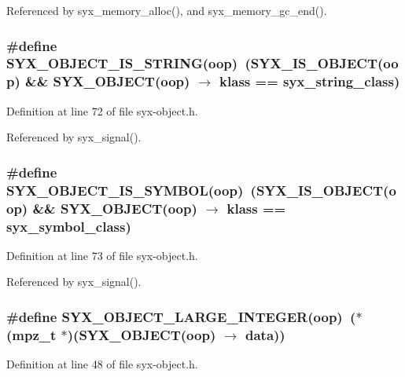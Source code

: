 Referenced by syx\_\-memory\_\-alloc(), and syx\_\-memory\_\-gc\_\-end().\hypertarget{syx-object_8h_d204bd0bc6eafc156499e29e5c33730d}{
\subsubsection{\setlength{\rightskip}{0pt plus 5cm}\#define SYX\_\-OBJECT\_\-IS\_\-STRING(oop)~(SYX\_\-IS\_\-OBJECT(oop) \&\& SYX\_\-OBJECT(oop) $\rightarrow$ klass == {\bf syx\_\-string\_\-class})}}
\label{syx-object_8h_d204bd0bc6eafc156499e29e5c33730d}




Definition at line 72 of file syx-object.h.

Referenced by syx\_\-signal().\hypertarget{syx-object_8h_d411630830fe2cd1696bce40096b181f}{
\subsubsection{\setlength{\rightskip}{0pt plus 5cm}\#define SYX\_\-OBJECT\_\-IS\_\-SYMBOL(oop)~(SYX\_\-IS\_\-OBJECT(oop) \&\& SYX\_\-OBJECT(oop) $\rightarrow$ klass == {\bf syx\_\-symbol\_\-class})}}
\label{syx-object_8h_d411630830fe2cd1696bce40096b181f}




Definition at line 73 of file syx-object.h.

Referenced by syx\_\-signal().\hypertarget{syx-object_8h_65df887ffb379b9452e3e6796532ada5}{
\subsubsection{\setlength{\rightskip}{0pt plus 5cm}\#define SYX\_\-OBJECT\_\-LARGE\_\-INTEGER(oop)~($\ast$(mpz\_\-t $\ast$)(SYX\_\-OBJECT(oop) $\rightarrow$ data))}}
\label{syx-object_8h_65df887ffb379b9452e3e6796532ada5}




Definition at line 48 of file syx-object.h.

